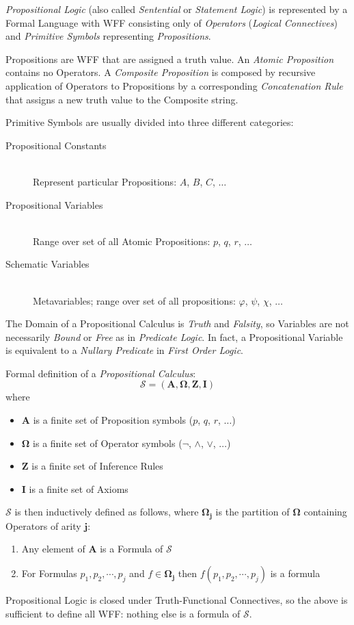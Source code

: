\documentclass{article}
\begin{document}
\emph{Propositional Logic} (also called \emph{Sentential} or
\emph{Statement Logic}) is represented by a Formal Language with WFF
consisting only of \emph{Operators} (\emph{Logical Connectives}) and
\emph{Primitive Symbols} representing \emph{Propositions}.

Propositions are WFF that are assigned a truth value. An \emph{Atomic
  Proposition} contains no Operators. A \emph{Composite Proposition}
is composed by recursive application of Operators to Propositions by a
corresponding \emph{Concatenation Rule} that assigns a new truth value
to the Composite string.

Primitive Symbols are usually divided into three different categories:
\begin{description}
\item[Propositional Constants] \hfill \\
Represent particular Propositions: $A$, $B$, $C$, $\ldots$
\item[Propositional Variables] \hfill \\
Range over set of all Atomic Propositions: $p$, $q$, $r$, $\ldots$
\item[Schematic Variables] \hfill \\
Metavariables; range over set of all propositions: $\varphi$, $\psi$,
$\chi$, $\ldots$
\end{description}

The Domain of a Propositional Calculus is \emph{Truth} and
\emph{Falsity}, so Variables are not necessarily \emph{Bound} or
\emph{Free} as in \emph{Predicate Logic}. In fact, a Propositional
Variable is equivalent to a \emph{Nullary Predicate} in \emph{First
  Order Logic}.

Formal definition of a \emph{Propositional Calculus}:
\[
    \mathcal{S} = (\mathbf{A},\mathbf{\Omega},\mathbf{Z},\mathbf{I})
\]
where
\begin{itemize}
\item $\mathbf{A}$ is a finite set of Proposition symbols ($p$, $q$,
  $r$, $\ldots$)
\item $\mathbf{\Omega}$ is a finite set of Operator symbols ($\neg$,
  $\wedge$, $\vee$, $\ldots$)
\item $\mathbf{Z}$ is a finite set of Inference Rules
\item $\mathbf{I}$ is a finite set of Axioms
\end{itemize}
$\mathcal{S}$ is then inductively defined as follows, where
$\mathbf{\Omega_j}$ is the partition of $\mathbf{\Omega}$ containing
Operators of arity $\mathbf{j}$:
\begin{enumerate}
\item Any element of $\mathbf{A}$ is a Formula of $\mathcal{S}$
\item For Formulas $p_1, p_2, \cdots, p_j$ and $f \in
  \mathbf{\Omega_j}$ then $f(p_1, p_2, \cdots, p_j)$ is a formula
\end{enumerate}
Propositional Logic is closed under Truth-Functional Connectives, so
the above is sufficient to define all WFF: nothing else is a formula
of $\mathcal{S}$.
\end{document}
